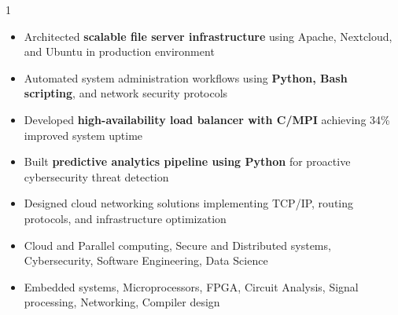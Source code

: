 \documentclass[11pt,a4paper,ragged2e]{altacv}
\begin{document}
\begin{paracol}{1}

\begin{itemize}
\item Architected \textbf{scalable file server infrastructure} using Apache, Nextcloud, and Ubuntu in production environment
\item Automated system administration workflows using \textbf{Python, Bash scripting}, and network security protocols
\item Developed \textbf{high-availability load balancer with C/MPI} achieving 34\% improved system uptime
\item Built \textbf{predictive analytics pipeline using Python} for proactive cybersecurity threat detection
\item Designed cloud networking solutions implementing TCP/IP, routing protocols, and infrastructure optimization
\end{itemize}

\medskip

\begin{itemize} 
\item Cloud and Parallel computing, Secure and Distributed systems, Cybersecurity, Software Engineering, Data Science
\item Embedded systems, Microprocessors, FPGA, Circuit Analysis, Signal processing, Networking,  Compiler design
\end{itemize}


\end{paracol}
\end{document}
